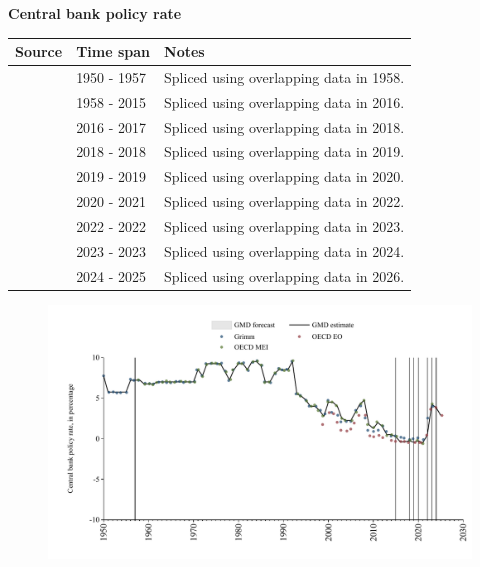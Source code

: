 \documentclass[12pt,a4paper,landscape]{article}
\begin{document}
\begin{adjustbox}{max totalsize={\paperwidth}{\paperheight},center}
\begin{minipage}[t][\textheight][t]{\textwidth}
\vspace*{0.5cm}
{}
\begin{center}
{\Large\bfseries Central bank policy rate}
\end{center}
\vspace{0.5cm}
\begin{table}[H]
\centering
\small
\begin{tabular}{|l|l|l|}
\hline
\textbf{Source} & \textbf{Time span} & \textbf{Notes} \\
\hline
\rowcolor{white}\cite{Grimm}& 1950 - 1957 &Spliced using overlapping data in 1958. \\
\rowcolor{lightgray}\cite{OECD_MEI}& 1958 - 2015 &Spliced using overlapping data in 2016. \\
\rowcolor{white}\cite{OECD_EO}& 2016 - 2017 &Spliced using overlapping data in 2018. \\
\rowcolor{lightgray}\cite{OECD_MEI}& 2018 - 2018 &Spliced using overlapping data in 2019. \\
\rowcolor{white}\cite{OECD_EO}& 2019 - 2019 &Spliced using overlapping data in 2020. \\
\rowcolor{lightgray}\cite{OECD_MEI}& 2020 - 2021 &Spliced using overlapping data in 2022. \\
\rowcolor{white}\cite{OECD_EO}& 2022 - 2022 &Spliced using overlapping data in 2023. \\
\rowcolor{lightgray}\cite{OECD_MEI}& 2023 - 2023 &Spliced using overlapping data in 2024. \\
\rowcolor{white}\cite{OECD_EO}& 2024 - 2025 &Spliced using overlapping data in 2026. \\
\hline
\end{tabular}
\end{table}
\begin{figure}[H]
\centering
\includegraphics[width=\textwidth,height=0.6\textheight,keepaspectratio]{graphs/FIN_cbrate.pdf}
\end{figure}
\end{minipage}
\end{adjustbox}
\end{document}
